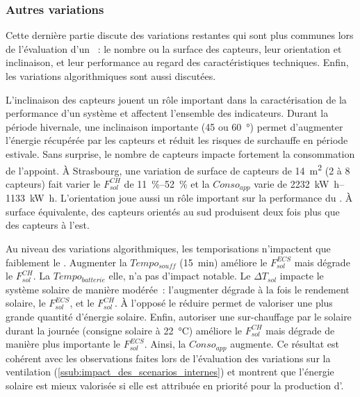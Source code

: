 \subsubsection{Autres variations} %
\label{ssub:autres_variations}
Cette dernière partie discute des variations restantes qui sont plus communes lors
de l’évaluation d’un ~: le nombre ou la surface des capteurs, leur
orientation et inclinaison, et leur performance au regard des caractéristiques techniques.
Enfin, les variations algorithmiques sont aussi discutées.

L’inclinaison des capteurs jouent un rôle important dans la caractérisation de la performance d’un
système  et affectent l’ensemble des indicateurs.
Durant la période hivernale, une inclinaison
importante (\num{45} ou \SI{60}{\degree}) permet d’augmenter l’énergie récupérée par les
capteurs et réduit les risques de surchauffe en période estivale. Sans surprise, le
nombre de capteurs impacte fortement la consommation de l’appoint. À Strasbourg, une
variation de surface de capteurs de \SI{14}{\meter\squared} (\num{2} à \num{8} capteurs)
fait varier le $F_{sol}^{CH}$ de \SIrange{11}{52}{\percent} et la $Conso_{app}$ varie de
\SIrange{2232}{1133}{\kilo\watt\hour}. L’orientation joue aussi un rôle important sur la
performance du . À surface équivalente, des capteurs orientés au sud produisent deux
fois plus que des capteurs à l’est.

Au niveau des variations algorithmiques, les temporisations n’impactent que faiblement
le . Augmenter la $Tempo_{souff}$ (\SI{15}{min}) améliore le $F_{sol}^{ECS}$ mais dégrade
le $F_{sol}^{CH}$. La $Tempo_{batterie}$ elle, n’a pas d’impact notable. Le $\Delta T_{sol}$
impacte le système solaire de manière modérée~: l’augmenter dégrade à la fois le rendement
solaire, le $F_{sol}^{ECS}$, et le $F_{sol}^{CH}$. À l’opposé le réduire permet de valoriser une plus
grande quantité d’énergie solaire. Enfin, autoriser une sur-chauffage par le solaire
durant la journée (consigne solaire à \SI{22}{\celsius}) améliore le $F_{sol}^{CH}$ mais dégrade
de manière plus importante le $F_{sol}^{ECS}$. Ainsi, la $Conso_{app}$ augmente. Ce résultat est
cohérent avec les observations faites lors de l’évaluation des variations sur la
ventilation (\ref{ssub:impact_des_scenarios_internes}) et montrent que l’énergie solaire
est mieux valorisée si elle est attribuée en priorité pour la production d’.

